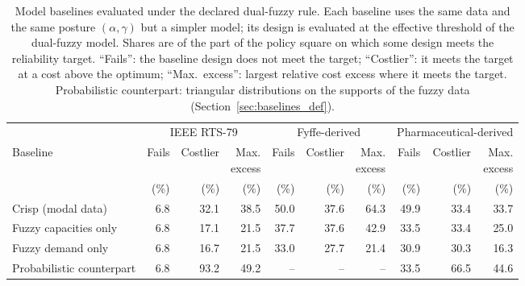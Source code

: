 \begin{table}[!htbp]
\centering
\caption{Model baselines evaluated under the declared dual-fuzzy rule. Each baseline uses the same data and the same posture $(\alpha,\gamma)$ but a simpler model; its design is evaluated at the effective threshold of the dual-fuzzy model. Shares are of the part of the policy square on which some design meets the reliability target. ``Fails'': the baseline design does not meet the target; ``Costlier'': it meets the target at a cost above the optimum; ``Max.\ excess'': largest relative cost excess where it meets the target. Probabilistic counterpart: triangular distributions on the supports of the fuzzy data (Section~\ref{sec:baselines_def}).}
\label{tab:baselines}
\footnotesize
\setlength{\tabcolsep}{4pt}
\begin{tabular}{l rrr rrr rrr}
\hline
 & \multicolumn{3}{c}{IEEE RTS-79} & \multicolumn{3}{c}{Fyffe-derived} & \multicolumn{3}{c}{Pharmaceutical-derived}\\
Baseline & Fails & Costlier & \shortstack{Max.\\excess} & Fails & Costlier & \shortstack{Max.\\excess} & Fails & Costlier & \shortstack{Max.\\excess}\\
 & (\%) & (\%) & (\%) & (\%) & (\%) & (\%) & (\%) & (\%) & (\%)\\
\hline
Crisp (modal data) & 6.8 & 32.1 & 38.5 & 50.0 & 37.6 & 64.3 & 49.9 & 33.4 & 33.7\\
Fuzzy capacities only & 6.8 & 17.1 & 21.5 & 37.7 & 37.6 & 42.9 & 33.5 & 33.4 & 25.0\\
Fuzzy demand only & 6.8 & 16.7 & 21.5 & 33.0 & 27.7 & 21.4 & 30.9 & 30.3 & 16.3\\
Probabilistic counterpart & 6.8 & 93.2 & 49.2 & -- & -- & -- & 33.5 & 66.5 & 44.6\\
\hline
\end{tabular}
\end{table}
